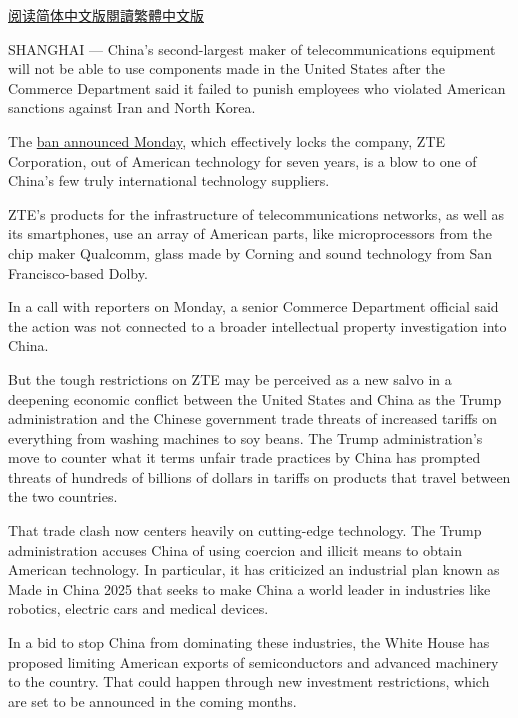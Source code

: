 \href{http://cn.nytimes.com/technology/20180417/chinese-tech-company-blocked-from-buying-american-components/}{阅读简体中文版}\href{http://cn.nytimes.com/technology/20180417/chinese-tech-company-blocked-from-buying-american-components/zh-hant/}{閱讀繁體中文版}

SHANGHAI --- China's second-largest maker of telecommunications
equipment will not be able to use components made in the United States
after the Commerce Department said it failed to punish employees who
violated American sanctions against Iran and North Korea.

The
\href{https://www.commerce.gov/sites/commerce.gov/files/zte_denial_order.pdf}{ban
announced Monday}, which effectively locks the company, ZTE Corporation,
out of American technology for seven years, is a blow to one of China's
few truly international technology suppliers.

ZTE's products for the infrastructure of telecommunications networks, as
well as its smartphones, use an array of American parts, like
microprocessors from the chip maker Qualcomm, glass made by Corning and
sound technology from San Francisco-based Dolby.

In a call with reporters on Monday, a senior Commerce Department
official said the action was not connected to a broader intellectual
property investigation into China.

But the tough restrictions on ZTE may be perceived as a new salvo in a
deepening economic conflict between the United States and China as the
Trump administration and the Chinese government trade threats of
increased tariffs on everything from washing machines to soy beans. The
Trump administration's move to counter what it terms unfair trade
practices by China has prompted threats of hundreds of billions of
dollars in tariffs on products that travel between the two countries.

That trade clash now centers heavily on cutting-edge technology. The
Trump administration accuses China of using coercion and illicit means
to obtain American technology. In particular, it has criticized an
industrial plan known as Made in China 2025 that seeks to make China a
world leader in industries like robotics, electric cars and medical
devices.

In a bid to stop China from dominating these industries, the White House
has proposed limiting American exports of semiconductors and advanced
machinery to the country. That could happen through new investment
restrictions, which are set to be announced in the coming months.


